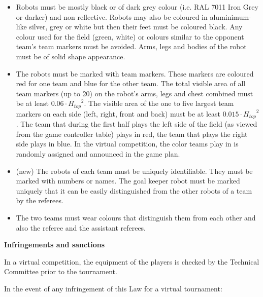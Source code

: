 \begin{itemize}
\item {}Robots must be mostly black or of dark grey colour (i.e.
  RAL 7011 Iron Grey or darker) and non reflective. Robots may also be coloured
  in aluminimum-like silver, grey or white but then their feet must be coloured
  black. Any colour used for the field (green, white) or colours similar to the
  opponent team's team markers must be avoided. Arms, legs and bodies of the
  robot must be of solid shape appearance.
\item {}The robots must be marked with team markers.
      These markers are coloured red for one team and blue for the other team.
      The total visible area of all team markers (up to 20) on the robot's arms,
      legs and chest combined must be at least $0.06\cdot {H_{top}}^2$.
      The visible area of the one to five largest team markers on each side
      (left, right, front and back) must be at least $0.015\cdot {H_{top}}^2$.
      The team that during the first half plays the left side of the field (as viewed from the game controller table) plays in red, the team that plays the right side plays in blue.
      In the virtual competition, the color teams play in is randomly assigned and announced in the game plan.

\item (new) The robots of each team must be uniquely identifiable. They must be marked with numbers or names. The goal keeper robot must be marked uniquely that it can be easily distinguished from the other robots of a team by the referees.
\item The two teams must wear colours that distinguish them from each other and also the referee and the assistant referees.
\end{itemize}

\bigskip

{\bfseries Infringements and sanctions}

\headlinebox

In a virtual competition, the equipment of the players is checked by the Technical Committee prior to the tournament.

\bigskip

In the event of any infringement of this Law for a virtual tournament:

